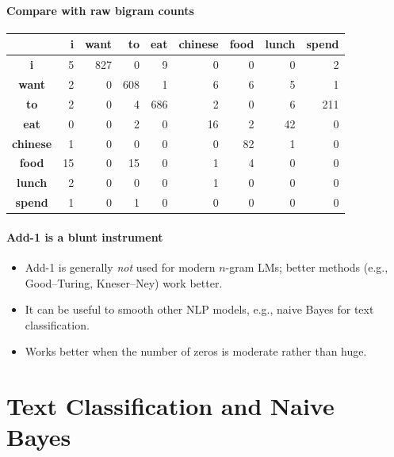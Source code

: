 \documentclass[11pt,a4paper]{article}
\theoremstyle{definition}
\theoremstyle{plain}
\theoremstyle{remark}
\begin{document}
\subsection{Compare with raw bigram counts}
\begin{center}
\setlength{\tabcolsep}{6pt}
\renewcommand{\arraystretch}{1.2}
\scriptsize
\begin{tabular}{|c|r|r|r|r|r|r|r|r|}
\hline
 & \textbf{i} & \textbf{want} & \textbf{to} & \textbf{eat} & \textbf{chinese} & \textbf{food} & \textbf{lunch} & \textbf{spend} \\ \hline
\textbf{i}       & 5  & 827 & 0 & 9  & 0  & 0  & 0  & 2   \\ \hline
\textbf{want}    & 2  & 0   & 608& 1  & 6  & 6  & 5  & 1   \\ \hline
\textbf{to}      & 2  & 0   & 4  & 686& 2  & 0  & 6  & 211 \\ \hline
\textbf{eat}     & 0  & 0   & 2  & 0  & 16 & 2  & 42 & 0   \\ \hline
\textbf{chinese} & 1  & 0   & 0  & 0  & 0  & 82 & 1  & 0   \\ \hline
\textbf{food}    & 15 & 0   & 15 & 0  & 1  & 4  & 0  & 0   \\ \hline
\textbf{lunch}   & 2  & 0   & 0  & 0  & 1  & 0  & 0  & 0   \\ \hline
\textbf{spend}   & 1  & 0   & 1  & 0  & 0  & 0  & 0  & 0   \\ \hline
\end{tabular}
\end{center}

\subsection{Add-1 is a blunt instrument}
\begin{itemize}
    \item Add-1 is generally \emph{not} used for modern $n$-gram LMs; better methods (e.g., Good--Turing, Kneser--Ney) work better.
    \item It can be useful to smooth other NLP models, e.g., naive Bayes for text classification.
    \item Works better when the number of zeros is moderate rather than huge.
\end{itemize}



\newpage

\part{Text Classification and Naive Bayes}
\end{document}
